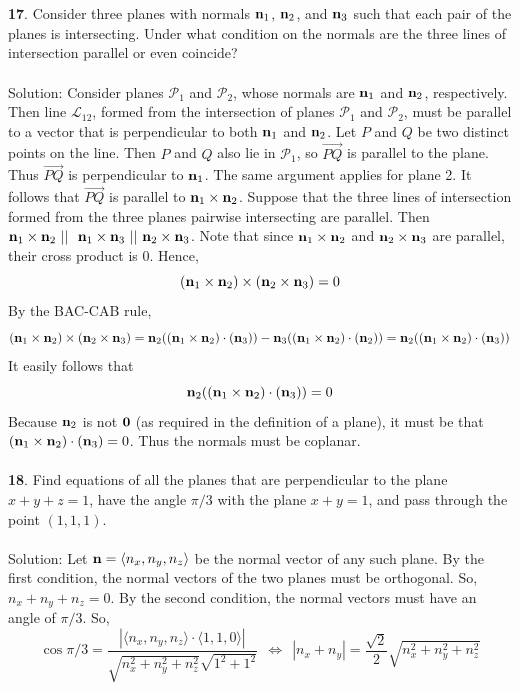 \documentclass[12pt]{amsbook}
\newcommand{\la}{\langle}
\newcommand{\ra}{\rangle}
\begin{document}
\\
\\ 
{\small\bf 17}. Consider three planes with normals ${\bf n}_1$, ${\bf
n}_2$, and ${\bf n}_3$ such that each pair of the planes is
intersecting. Under what condition on the normals are the three
lines of intersection parallel or even coincide?\\
\\
{\sc Solution}: Consider planes $\mathcal{P}_1$ and $\mathcal{P}_2$, whose normals are ${\bf n}_1$ and  ${\bf n}_2$, respectively. Then line $\mathcal{L}_{12}$, formed from the intersection of planes $\mathcal{P}_1$ and $\mathcal{P}_2$, must be parallel to a vector that is perpendicular to both ${\bf n}_1$ and  ${\bf n}_2$. Let $P$ and $Q$ be two distinct points on the line. Then $P$ and $Q$ also lie in $\mathcal{P}_1$, so $\overrightarrow{PQ}$ is parallel to the plane. Thus $\overrightarrow{PQ}$ is perpendicular to ${\bf n}_1$. The same argument applies for plane 2. It follows that $\overrightarrow{PQ}$ is parallel to ${\bf n}_1\times{\bf n}_2$. Suppose that the three lines of intersection formed from the three planes pairwise intersecting are parallel. Then ${\bf n}_1\times{\bf n}_2 \ || \ \ {\bf n}_1\times{\bf n}_3 \ || \ {\bf n}_2\times{\bf n}_3$. Note that since ${\bf n}_1\times{\bf n}_2$ and ${\bf n}_2\times{\bf n}_3$ are parallel, their cross product is $0$. Hence,
$$({\bf n}_1\times{\bf n}_2)\times({\bf n}_2\times{\bf n}_3)=0$$
By the BAC-CAB rule,
$$({\bf n}_1\times{\bf n}_2)\times({\bf n}_2\times{\bf n}_3)={\bf n}_2(({\bf n}_1\times{\bf n}_2)\cdot({\bf n}_3))-{\bf n}_3(({\bf n}_1\times{\bf n}_2)\cdot({\bf n}_2))={\bf n}_2(({\bf n}_1\times{\bf n}_2)\cdot({\bf n}_3))$$
It easily follows that
$${\bf n}_2(({\bf n}_1\times{\bf n}_2)\cdot({\bf n}_3))=0$$
Because ${\bf n}_2$ is not $\bf 0$ (as required in the definition of a plane), it must be that $({\bf n}_1\times{\bf n}_2)\cdot({\bf n}_3)=0$. Thus the normals must be coplanar. 
\\
\\
{\small\bf 18}. Find equations of all the planes that 
are perpendicular to the plane $x+y+z=1$, have the angle
$\pi/3$ with the plane $x+y=1$, and pass through
the point $(1,1,1)$.\\
\\
{\sc Solution}: Let ${\bf n}=\la n_x,n_y,n_z\ra$ be the normal vector of any such plane. By the first condition, the normal vectors of the two planes must be orthogonal. So, $n_x+n_y+n_z=0$. By the second condition, the normal vectors must have an angle of $\pi/3$. So, $$\cos\pi/3=\frac{|\la n_x,n_y,n_z\ra\cdot\la 1,1,0\ra|}{\sqrt{n_x^2+n_y^2+n_z^2}\sqrt{1^2+1^2}} \ \ \Leftrightarrow \ \ |n_x+n_y|=\frac{\sqrt{2}}{2}\sqrt{n_x^2+n_y^2+n_z^2}$$
\end{document}
